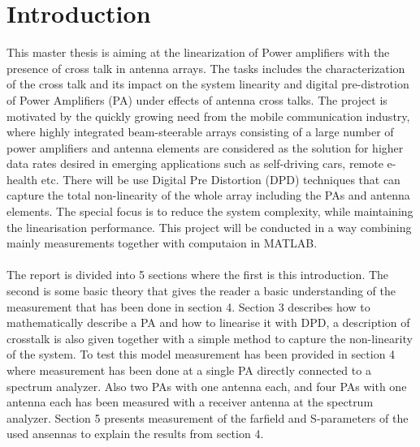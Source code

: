 \chapter{Introduction}\label{ch:introduction}

This master thesis is aiming at the linearization of Power amplifiers with the presence of cross talk in antenna arrays. The tasks includes the characterization of the cross talk and its impact on the system linearity and digital pre-distrotion of Power Amplifiers (PA) under effects of antenna cross talks. The project is motivated by the quickly growing need from the mobile communication industry, where highly integrated beam-steerable arrays consisting of a large number of power amplifiers and antenna elements are considered as the solution for higher data rates desired in emerging applications such as self-driving cars, remote e-health etc. There will be use Digital Pre Distortion (DPD) techniques that can capture the total non-linearity of the whole array including the PAs and antenna elements. The special focus is to reduce the system complexity, while maintaining the linearisation performance. This project will be conducted in a way combining mainly measurements together with computaion in MATLAB.
\\
\\
The report is divided into 5 sections where the first is this introduction. The second is some basic theory that gives the reader a basic understanding of the measurement that has been done in section 4. Section 3 describes how to mathematically describe a PA and how to linearise it with DPD, a description of crosstalk is also given together with a simple method to capture the non-linearity of the system. To test this model measurement has been provided in section 4 where measurement has been done at a single PA directly connected to a spectrum analyzer. Also two PAs with one antenna each, and four PAs with one antenna each has been measured with a receiver antenna at the spectrum analyzer. Section 5 presents measurement of the farfield and S-parameters of the used ansennas to explain the results from section 4.    


